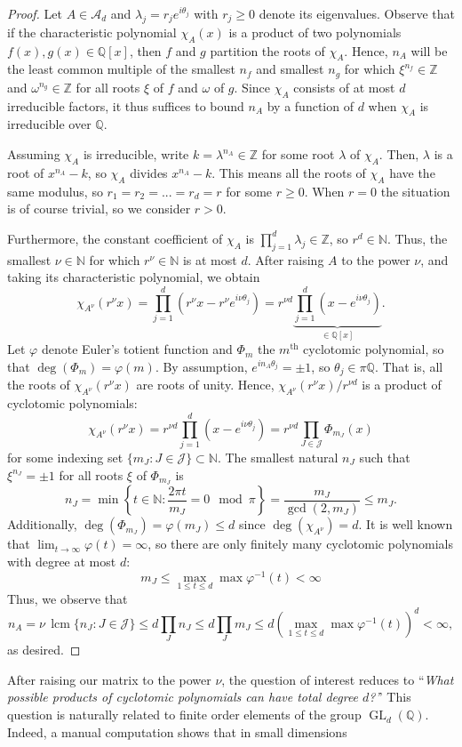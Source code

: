 \documentclass{article}
\def\N{\mathbb{N}}
\def\Q{\mathbb{Q}}
\def\Z{\mathbb{Z}}
\def\mJ{\mathcal{J}}
\def\lcm{\operatorname{lcm}}
\newcommand{\brac}[1]{\left({#1}\right)}
\newcommand{\Set}[1]{\left\{ #1 \right\}}
\newcommand{\set}[1]{\{ #1 \}}
\begin{document}
\begin{proof}
    Let $A\in \mathcal{A}_d$ and $\lambda_j = r_je^{i\theta_j}$ with $r_j \ge 0$ denote its eigenvalues. Observe that if the characteristic polynomial $\chi_A(x)$ is a product of two polynomials $f(x), g(x) \in \Q[x]$, then $f$ and $g$ partition the roots of $\chi_A$. Hence, $n_A$ will be the least common multiple of the smallest $n_f$ and smallest $n_g$ for which $\xi^{n_f} \in \Z$ and $\omega^{n_g} \in \Z$ for all roots $\xi$ of $f$ and $\omega$ of $g$. Since $\chi_A$ consists of at most $d$ irreducible factors, it thus suffices to bound $n_A$ by a function of $d$ when $\chi_A$ is irreducible over $\Q$.
    
    Assuming $\chi_A$ is irreducible, write $k = \lambda^{n_A} \in \Z$ for some root $\lambda$ of $\chi_A$. Then, $\lambda$ is a root of $x^{n_A} - k$, so $\chi_A$ divides $x^{n_A} - k$. This means all the roots of $\chi_A$ have the same modulus, so $r_1=r_2=...=r_d=r$ for some $r\geq0$. When $r=0$ the situation is of course trivial, so we consider $r>0$. 
    
    
    Furthermore, the constant coefficient of $\chi_A$ is $\prod_{j=1}^d \lambda_j\in \Z$, so $r^d \in \N$. Thus, the smallest $\nu \in \N$ for which $r^\nu \in \N$ is at most $d$. After raising $A$ to the power $\nu$, and taking its characteristic polynomial, we obtain 
    $$
        \chi_{A^\nu}( r^\nu x) = \prod_{j=1}^d \brac{r^\nu x - r^\nu e^{i \nu\theta_j}}= r^{\nu d} \underbrace{\prod_{j=1}^d \brac{x - e^{i \nu\theta_j}}}_{\in \Q[x]}.
    $$
    Let $\varphi$ denote Euler's totient function and $\Phi_m$ the $m^{\text{th}}$ cyclotomic polynomial, so that $\deg(\Phi_m) = \varphi(m)$. By assumption, $e^{in_A\theta_j} = \pm 1$, so $\theta_j \in \pi \Q$. That is, all the roots of $\chi_{A^\nu}( r^\nu x)$ are roots of unity. Hence, $\chi_{A^\nu}( r^\nu x)/r^{\nu d}$ is a product of cyclotomic polynomials:
    $$
        \chi_{A^\nu}( r^\nu x) = r^{\nu d} \prod_{j=1}^d \brac{x - e^{i \nu\theta_j}} = r^{\nu d} \prod_{J \in \mJ} \Phi_{m_J}(x)
    $$
    for some indexing set $\set{m_J: J \in \mJ} \subset \N$. The smallest natural $n_J$ such that $\xi^{n_J} =\pm 1$ for all roots $\xi$ of $\Phi_{m_J}$ is
    $$
        n_J = \min \Set{t \in \N: \frac{2\pi t}{m_J} = 0 \mod \pi} = \frac{m_J}{\gcd(2,m_J)} \le m_J.
    $$
    Additionally, $\deg(\Phi_{m_J}) = \varphi(m_J) \le d$ since $\deg(\chi_{A^\nu}) = d$. It is well known that $\lim_{t \to \infty} \varphi(t) = \infty$, so there are only finitely many cyclotomic polynomials with degree at most $d$:
    $$
         m_J \le \max_{1 \le t \le d} \max \varphi^{-1}(t) < \infty
    $$
    Thus, we observe that
    $$
        n_A = \nu \, \lcm\set{n_J : J \in \mJ} \le d \prod_{J} n_J \le d \prod_{J} m_J \le d \brac{\max_{1 \le t \le d} \max \varphi^{-1}(t)}^d < \infty,
    $$
    as desired.
\end{proof}
After raising our matrix to the power $\nu$, the question of interest reduces to ``\textit{What possible products of cyclotomic polynomials can have total degree $d$?'}' This question is naturally related to finite order elements of the group $\operatorname{GL}_d(\Q)$. Indeed, a manual computation shows that in small dimensions 
\end{document}
